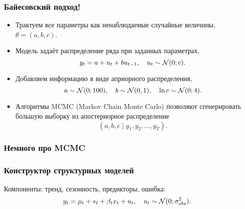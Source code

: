 \begin{frame}
  \frametitle{Байесовский подход!}

  \begin{itemize}[<+->]
    \item Трактуем все параметры как ненаблюдаемые \alert{случайные величины}, $\theta = (a, b, c)$.
    \item \alert{Модель} задаёт распределение ряда при заданных параметрах,
    \[
    y_t = a + u_t + b u_{t-1}, \quad u_t \sim \mathcal{N}(0; c).  
    \]
    \item Добавляем информацию в виде \alert{априорного распределения},
    \[
    a \sim \mathcal{N}(0;100), \quad b \sim \mathcal{N}(0, 1), \quad \ln c \sim \mathcal{N}(0;4).  
    \]
    \item Алгоритмы MCMC (Markov Chain Monte Carlo) позволяют 
    сгенерировать большую выборку из \alert{апостериорное распределение}
    \[
    (a, b, c \mid y_1, y_2, \ldots, y_T).
    \]
\end{itemize}

\end{frame}


\begin{frame}
  \frametitle{Немного про MCMC}
  
\begin{itemize}
  
\end{itemize}

\end{frame}

\begin{frame}
  \frametitle{Конструктор структурных моделей}

  Компоненты: \alert{тренд}, \alert{сезонность}, \alert{предикторы}, \alert{ошибка}:
  \[
  y_t = \mu_t + s_t + \beta_t x_t +  u_t, \quad u_t \sim \mathcal{N}(0; \sigma^2_{obs}).  
  \]


\end{frame}

